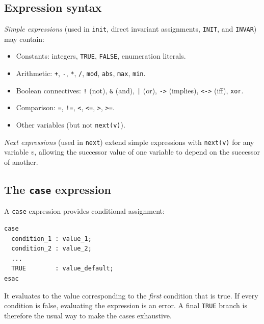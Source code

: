 \subsection{Expression syntax}
\label{sec:smv-exprs}

\emph{Simple expressions} (used in \texttt{init}, direct invariant
assignments, \texttt{INIT}, and \texttt{INVAR}) may contain:
\begin{itemize}
  \item Constants: integers, \texttt{TRUE}, \texttt{FALSE}, enumeration
        literals.
  \item Arithmetic: \texttt{+}, \texttt{-}, \texttt{*}, \texttt{/},
        \texttt{mod}, \texttt{abs}, \texttt{max}, \texttt{min}.
  \item Boolean connectives: \texttt{!} (not), \texttt{\&} (and),
        \texttt{|} (or), \texttt{->} (implies), \texttt{<->} (iff),
        \texttt{xor}.
  \item Comparison: \texttt{=}, \texttt{!=}, \texttt{<}, \texttt{<=},
        \texttt{>}, \texttt{>=}.
  \item Other variables (but not \texttt{next(v)}).
\end{itemize}

\emph{Next expressions} (used in \texttt{next}) extend simple expressions
with \texttt{next(v)} for any variable $v$, allowing the successor value of
one variable to depend on the successor of another.

\subsection{The \texttt{case} expression}
\label{sec:smv-case}

A \texttt{case} expression provides conditional assignment:
\begin{verbatim}
case
  condition_1 : value_1;
  condition_2 : value_2;
  ...
  TRUE        : value_default;
esac
\end{verbatim}
It evaluates to the value corresponding to the \emph{first} condition that
is true.  If every condition is false, evaluating the expression is an
error.  A final \texttt{TRUE} branch is therefore the usual way to make the
cases exhaustive.

